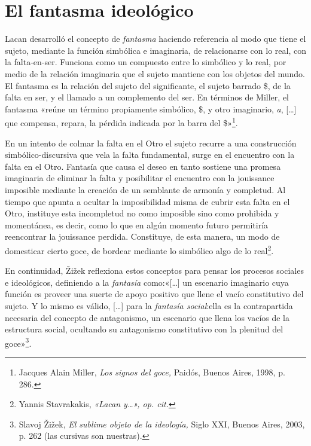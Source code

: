 \section{El fantasma ideológico}

Lacan desarrolló el concepto de \emph{fantasma} haciendo referencia al modo que tiene el sujeto, mediante la función simbólica e imaginaria, de relacionarse con lo real, con la falta-en-ser. Funciona como un compuesto entre lo simbólico y lo real, por medio de la relación imaginaria que el sujeto mantiene con los objetos del mundo. El fantasma es la relación del sujeto del significante, el sujeto barrado \$, de la falta en ser, y el llamado a un complemento del ser. En términos de Miller, el fantasma «reúne un término propiamente simbólico, \$, y otro imaginario, \emph{a}, {[}\ldots{]} que compensa, repara, la pérdida indicada por la barra del \$»\footnote{Jacques Alain Miller, \emph{Los signos del goce,} Paidós, Buenos Aires, 1998, p. 286.}.

En un intento de colmar la falta en el Otro el sujeto recurre a una construcción simbólico-discursiva que vela la falta fundamental, surge en el encuentro con la falta en el Otro. Fantasía que causa el deseo en tanto sostiene una promesa imaginaria de eliminar la falta y posibilitar el encuentro con la jouissance imposible mediante la creación de un semblante de armonía y completud. Al tiempo que apunta a ocultar la imposibilidad misma de cubrir esta falta en el Otro, instituye esta incompletud no como imposible sino como prohibida y momentánea, es decir, como lo que en algún momento futuro permitiría reencontrar la jouissance perdida. Constituye, de esta manera, un modo de domesticar cierto goce, de bordear mediante lo simbólico algo de lo real\footnote{Yannis Stavrakakis, \emph{«Lacan y\ldots», op. cit.}}.

En continuidad, Žižek reflexiona estos conceptos para pensar los procesos sociales e ideológicos, definiendo a la \emph{fantasía} como:«{[}\ldots{]} un escenario imaginario cuya función es proveer una suerte de apoyo positivo que llene el vacío constitutivo del sujeto. Y lo mismo es válido, {[}\ldots{]} para la \emph{fantasía social}:ella es la contrapartida necesaria del concepto de antagonismo, un escenario que llena los vacíos de la estructura social, ocultando su antagonismo constitutivo con la plenitud del goce»\footnote{Slavoj Žižek, \emph{El sublime objeto de la ideología,} Siglo XXI, Buenos Aires, 2003, p. 262 (las cursivas son nuestras).}.

